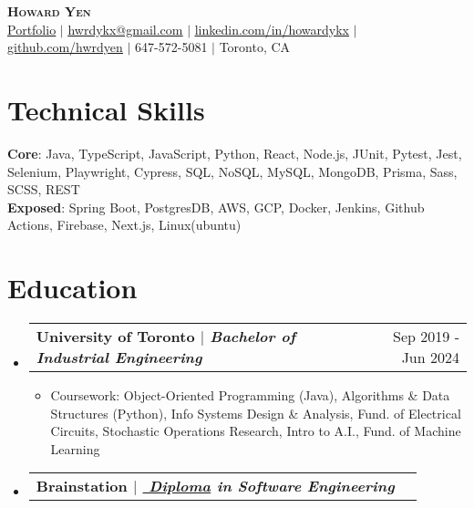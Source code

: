 \documentclass[letterpaper,11pt]{article}
\makeatletter
\newcommand{\resumeItem}[1]{
  \item\small{
    {#1 \vspace{0pt}}
  }
}
\newcommand{\resumeEducationHeading}[2]{
  \vspace{-2pt}\item
    \begin{tabular*}{0.97\textwidth}[t]{l@{\extracolsep{\fill}}r}
      \textbf{#1} & \small{#2} \\
    \end{tabular*}\vspace{-7pt}
}
\newcommand{\resumeSubHeadingListStart}{\begin{itemize}[leftmargin=0.15in, label={}]}
\newcommand{\resumeSubHeadingListEnd}{\end{itemize}}
\newcommand{\resumeItemListStart}{\linespread{1.1}\begin{itemize}}
\newcommand{\resumeItemListEnd}{\end{itemize}\vspace{-5pt}}
\makeatother
\begin{document}
\begin{center}
    \textbf{\Huge \scshape \textcolor{TitleBlue}{Howard Yen}} \\ \vspace{5pt}
    \small \href{https://hwrdyen.netlify.app/}{\underline{Portfolio}} $|$ \href{mailto:hwrdykx@gmail.com}{\underline{hwrdykx@gmail.com}} $|$ 
    \href{https://www.linkedin.com/in/howardykx/}{\underline{linkedin.com/in/howardykx}} $|$
    \href{https://github.com/hwrdyen}{\underline{github.com/hwrdyen}} $|$ 
    \small 647-572-5081 $|$
    \small Toronto, CA
\end{center}

\section{\textbf{\textcolor{TitleBlue}{Technical Skills}}}
 \begin{itemize}[leftmargin=0.15in, label={}]
    \small{\item{
     \textbf{Core}{: Java, TypeScript, JavaScript, Python, React, Node.js, JUnit, Pytest, Jest, Selenium, Playwright, Cypress,  \hspace*{28pt} SQL, NoSQL, MySQL, MongoDB, Prisma, Sass, SCSS, REST} \\
     \textbf{Exposed}{: Spring Boot, PostgresDB, AWS, GCP, Docker, Jenkins, Github Actions, Firebase, Next.js, Linux(ubuntu)} \\
    }}
 \end{itemize}

\section{\textbf{\textcolor{TitleBlue}{Education}}}
  \resumeSubHeadingListStart
    \resumeEducationHeading
          {\textbf{University of Toronto} $|$ \emph{Bachelor of Industrial Engineering}}{Sep 2019 - Jun 2024}
          \resumeItemListStart
            \resumeItem{Coursework: Object-Oriented Programming (Java), Algorithms \& Data Structures (Python), Info Systems Design \& Analysis, Fund. of Electrical Circuits, Stochastic Operations Research, Intro to A.I., Fund. of Machine Learning}
          \resumeItemListEnd
    \resumeEducationHeading
      {\textbf{Brainstation} $|$ \emph{\href{https://drive.google.com/file/d/1xsE1r73BNod3Vxk0RSKeM_JtRMXfE8Fr/view?usp=sharing}{\faLink $ $ \underline{Diploma}} in Software Engineering}}{}
  \resumeSubHeadingListEnd
\end{document}
